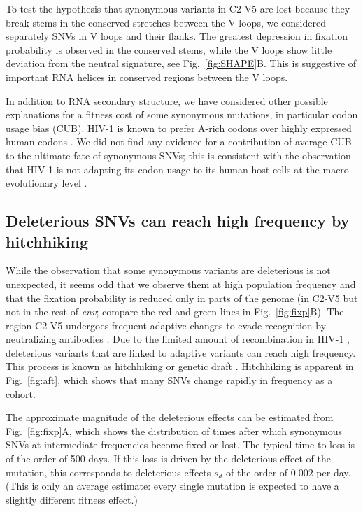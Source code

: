 \documentclass[11pt]{article}
\newcommand{\FIG}[1]{Fig.~\ref{fig:#1}}
\newcommand{\env}{\textit{env}}
\newcommand{\shankaregion}{C2-V5}
\begin{document}
To test the hypothesis that synonymous variants in \shankaregion{} are lost because they
break stems in the conserved stretches between the V loops, we considered
separately SNVs in V loops and their flanks. The greatest
depression in fixation probability is observed in the conserved stems, while the
V loops show little deviation from the neutral signature, see
\FIG{SHAPE}B. This is suggestive of important RNA helices in conserved
regions between the V loops.

In addition to RNA secondary structure, we have considered other possible
explanations for a fitness cost of some synonymous mutations, in particular
codon usage bias (CUB). HIV-1 is known to prefer A-rich codons over highly
expressed human codons \citep{jenkins_extent_2003, kuyl_biased_2012}. We
did not find any evidence for a contribution of average CUB to the ultimate
fate of synonymous SNVs; this is consistent with the observation that HIV-1 is not
adapting its codon usage to its human host cells at the macro-evolutionary level
\citep{kuyl_biased_2012}.


\subsection*{Deleterious SNVs can reach high frequency by hitchhiking}
While the observation that some synonymous variants are deleterious is not
unexpected, it seems odd that we observe them at high population
frequency and that the fixation probability is reduced only in parts of the
genome (in \shankaregion{} but not in the rest of \env{}; compare the red
and green lines in \FIG{fixp}B).
The region \shankaregion{} undergoes frequent adaptive changes to evade
recognition by neutralizing antibodies \cite{williamson_adaptation_2003,wei_antibody_2003,
richman_rapid_2003}. Due to the limited amount of recombination in HIV-1
\cite{neher_recombination_2010, batorsky_estimate_2011}, deleterious variants
that are linked to adaptive variants can reach high frequency. This process is
known as hitchhiking \citep{smith_hitch-hiking_1974} or genetic draft
\citep{gillespie_genetic_2000,neher_genetic_2011}. Hitchhiking is apparent in
\FIG{aft}, which shows that many SNVs change rapidly in frequency as a
cohort. 

The approximate magnitude of the deleterious effects can be estimated from
\FIG{fixp}A, which shows the distribution of times after which synonymous
SNVs at intermediate frequencies become fixed or lost. The typical time to
loss is of the order of 500 days. If this loss is driven by the deleterious
effect of the mutation, this corresponds to deleterious effects $s_d$ of the
order of $0.002$ per day. (This is only an average estimate: every single
mutation is expected to have a slightly different fitness effect.)
\end{document}
